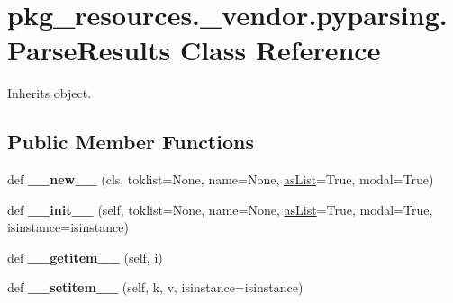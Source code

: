 \hypertarget{classpkg__resources_1_1__vendor_1_1pyparsing_1_1_parse_results}{}\section{pkg\+\_\+resources.\+\_\+vendor.\+pyparsing.\+Parse\+Results Class Reference}
\label{classpkg__resources_1_1__vendor_1_1pyparsing_1_1_parse_results}


Inherits object.

\subsection*{Public Member Functions}
\begin{DoxyCompactItemize}
\item 
\mbox{\label{classpkg__resources_1_1__vendor_1_1pyparsing_1_1_parse_results_adb1f118b2daee9f36c51bff263009901}} 
def {\bfseries \+\_\+\+\_\+new\+\_\+\+\_\+} (cls, toklist=None, name=None, \hyperlink{classpkg__resources_1_1__vendor_1_1pyparsing_1_1_parse_results_aa7e886aa0826871511b189660343f3aa}{as\+List}=True, modal=True)
\item 
\mbox{\label{classpkg__resources_1_1__vendor_1_1pyparsing_1_1_parse_results_a32484b94a9503cdb4abe2e4e02abdb99}} 
def {\bfseries \+\_\+\+\_\+init\+\_\+\+\_\+} (self, toklist=None, name=None, \hyperlink{classpkg__resources_1_1__vendor_1_1pyparsing_1_1_parse_results_aa7e886aa0826871511b189660343f3aa}{as\+List}=True, modal=True, isinstance=isinstance)
\item 
\mbox{\label{classpkg__resources_1_1__vendor_1_1pyparsing_1_1_parse_results_ab72c8f6214107ccb87c15e1ceffc89fb}} 
def {\bfseries \+\_\+\+\_\+getitem\+\_\+\+\_\+} (self, i)
\item 
\mbox{\label{classpkg__resources_1_1__vendor_1_1pyparsing_1_1_parse_results_add107f9bf8d6fcb3d1287e42d2e54a1f}} 
def {\bfseries \+\_\+\+\_\+setitem\+\_\+\+\_\+} (self, k, v, isinstance=isinstance)
\item 

\end{DoxyCompactItemize}
